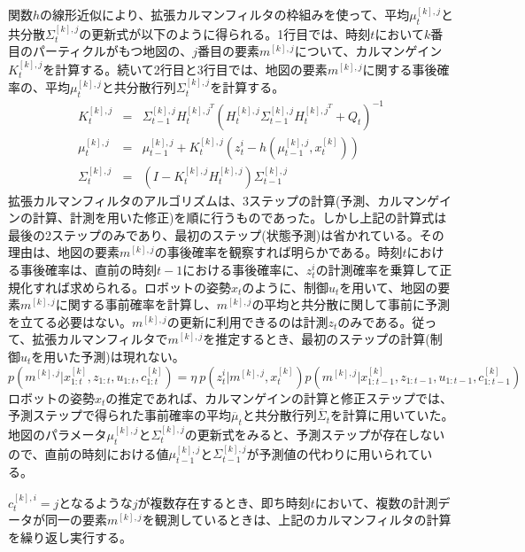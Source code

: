 \documentclass[dvipdfmx,a4paper]{jsarticle}
\begin{document}
関数$h$の線形近似により、拡張カルマンフィルタの枠組みを使って、平均$\mu_t^{[k], j}$と共分散$\Sigma_t^{[k], j}$の更新式が以下のように得られる。1行目では、時刻$t$において$k$番目のパーティクルがもつ地図の、$j$番目の要素$m^{[k], j}$について、カルマンゲイン$K_t^{[k], j}$を計算する。続いて2行目と3行目では、地図の要素$m^{[k], j}$に関する事後確率の、平均$\mu_t^{[k], j}$と共分散行列$\Sigma_t^{[k], j}$を計算する。
\begin{eqnarray}
	K_t^{[k], j} &=& \Sigma_{t - 1}^{[k], j} H_t^{{[k], j}^T} \left( H_t^{[k], j} \Sigma_{t - 1}^{[k], j} H_t^{{[k], j}^T} + Q_t \right)^{-1} \\
	\mu_t^{[k], j} &=& \mu_{t - 1}^{[k], j} + K_t^{[k], j} \left( z_t^i - h(\mu_{t - 1}^{[k], j}, x_t^{[k]}) \right) \\
	\Sigma_t^{[k], j} &=& \left( I - K_t^{[k], j} H_t^{[k], j} \right) \Sigma_{t - 1}^{[k], j}
\end{eqnarray}
拡張カルマンフィルタのアルゴリズムは、3ステップの計算(予測、カルマンゲインの計算、計測を用いた修正)を順に行うものであった。しかし上記の計算式は最後の2ステップのみであり、最初のステップ(状態予測)は省かれている。その理由は、地図の要素$m^{[k], j}$の事後確率を観察すれば明らかである。時刻$t$における事後確率は、直前の時刻$t - 1$における事後確率に、$z_t^i$の計測確率を乗算して正規化すれば求められる。ロボットの姿勢$x_t$のように、制御$u_t$を用いて、地図の要素$m^{[k], j}$に関する事前確率を計算し、$m^{[k], j}$の平均と共分散に関して事前に予測を立てる必要はない。$m^{[k], j}$の更新に利用できるのは計測$z_t$のみである。従って、拡張カルマンフィルタで$m^{[k], j}$を推定するとき、最初のステップの計算(制御$u_t$を用いた予測)は現れない。
\begin{equation}
	p(m^{[k], j} | x_{1 : t}^{[k]}, z_{1 : t}, u_{1 : t}, c_{1 : t}^{[k]}) = \eta \ p(z_t^i | m^{[k], j}, x_t^{[k]}) p(m^{[k], j} | x_{1 : t - 1}^{[k]}, z_{1 : t - 1}, u_{1 : t - 1}, c_{1 : t - 1}^{[k]}) \nonumber
\end{equation}
ロボットの姿勢$x_t$の推定であれば、カルマンゲインの計算と修正ステップでは、予測ステップで得られた事前確率の平均$\overline{\mu}_t$と共分散行列$\overline{\Sigma}_t$を計算に用いていた。地図のパラメータ$\mu_t^{[k], j}$と$\Sigma_t^{[k], j}$の更新式をみると、予測ステップが存在しないので、直前の時刻における値$\mu_{t - 1}^{[k], j}$と$\Sigma_{t - 1}^{[k], j}$が予測値の代わりに用いられている。\newline

$c_t^{[k], i} = j$となるような$j$が複数存在するとき、即ち時刻$t$において、複数の計測データが同一の要素$m^{[k], j}$を観測しているときは、上記のカルマンフィルタの計算を繰り返し実行する。\newline
\end{document}
